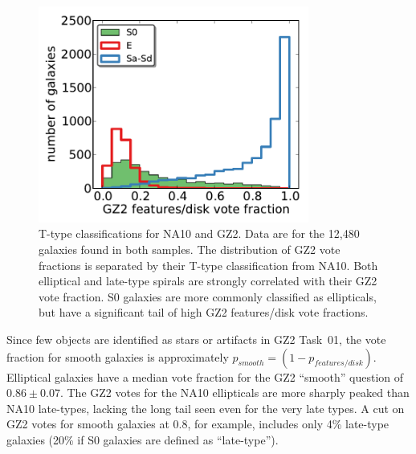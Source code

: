 \documentclass[useAMS,usenatbib]{mn2e}
\begin{document}

\begin{figure}
\includegraphics[angle=0,width=3.5in]{figures/na_ttype.pdf}
\caption{T-type classifications for NA10 and GZ2. Data are for the 12,480 galaxies found in both samples. The distribution of GZ2 vote fractions is separated by their T-type classification from NA10. Both elliptical and late-type spirals are strongly correlated with their GZ2 vote fraction. S0 galaxies are more commonly classified as ellipticals, but have a significant tail of high GZ2 features/disk vote fractions. 
\label{fig-na_ttype}}
\end{figure}

Since few objects are identified as stars or artifacts in GZ2 Task~01, the vote fraction for smooth galaxies is approximately $p_{smooth} = (1 - p_{features/disk})$. Elliptical galaxies have a median vote fraction for the GZ2 ``smooth'' question of $0.86\pm0.07$. The GZ2 votes for the NA10 ellipticals are more sharply peaked than NA10 late-types, lacking the long tail seen even for the very late types. A cut on GZ2 votes for smooth galaxies at 0.8, for example, includes only 4\% late-type galaxies (20\% if S0 galaxies are defined as ``late-type''). 
\end{document}
